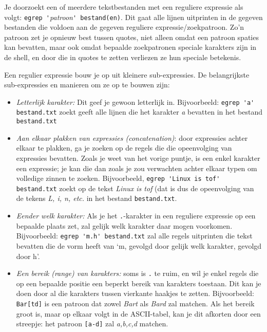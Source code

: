 \documentclass[a4paper,twoside,openany]{memoir}
\begin{document}
Je doorzoekt een of meerdere tekstbestanden met een reguliere expressie als
volgt: \verb!egrep '!\emph{patroon}\verb!' bestand(en)!. Dit gaat alle lijnen
uitprinten in de gegeven bestanden die voldoen aan de gegeven reguliere
expressie/zoekpatroon. Zo'n patroon zet je opnieuw best tussen quotes, niet
alleen omdat een patroon spaties kan bevatten, maar ook omdat bepaalde
zoekpatronen speciale karakters zijn in de shell, en door die in quotes te
zetten verliezen ze hun speciale betekenis.

Een regulier expressie bouw je op uit kleinere sub-expressies. De belangrijkste sub-expressies en manieren om ze op te bouwen zijn:

\begin{itemize}

  \item \emph{Letterlijk karakter:} Dit geef je gewoon letterlijk in.
    Bijvoorbeeld: \verb!egrep 'a' bestand.txt! zoekt geeft alle lijnen die het
    karakter \emph{a} bevatten in het bestand \verb!bestand.txt!

  \item \emph{Aan elkaar plakken van expressies (concatenation)}: door
    expressies achter elkaar te plakken, ga je zoeken op de regels die die
    opeenvolging van expressies bevatten. Zoals je weet van het vorige puntje,
    is een enkel karakter een expressie; je kan die dan zoals je zou verwachten
    achter elkaar typen om volledige zinnen te zoeken. Bijvoorbeeld,
    \verb!egrep 'Linux is tof' bestand.txt! zoekt op de tekst \emph{Linux is
    tof} (dat is dus de opeenvolging van de tekens \emph{L, i, n, etc.} in het
    bestand \verb!bestand.txt!.

  \item \emph{Eender welk karakter:} Als je het \verb!.!-karakter in een
    reguliere expressie op een bepaalde plaats zet, zal gelijk welk karakter
    daar mogen voorkomen. Bijvoorbeeld: \verb!egrep 'm.h' bestand.txt! zal alle
    regels uitprinten die tekst bevatten die de vorm heeft van `m, gevolgd door
    gelijk welk karakter, gevolgd door h'.

  \item \emph{Een bereik (range) van karakters:} soms is \verb!.! te ruim, en
    wil je enkel regels die op een bepaalde positie een beperkt bereik van
    karakters toestaan. Dit kan je doen door al die karakters tussen vierkante
    haakjes te zetten. Bijvoorbeeld: \verb!Bar[td]! is een patroon dat zowel
    \emph{Bart} als \emph{Bard} zal matchen. Als het bereik groot is, maar op
    elkaar volgt in de ASCII-tabel, kan je dit afkorten door een streepje: het
    patroon \verb![a-d]! zal \emph{a,b,c,d} matchen.


\end{itemize}
\end{document}
